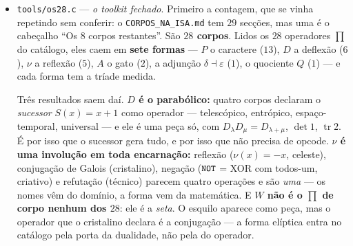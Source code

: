 \documentclass[11pt]{article}
\newcommand{\code}[1]{\texttt{\small #1}}
\newcommand{\Z}{\mathbb Z}
\theoremstyle{plain}
\theoremstyle{remark}
\newcommand{\tr}{\operatorname{tr}}
\begin{document}
\begin{itemize}
O rotor não é um terceiro objeto: é o \textbf{único autodual} --- o motor dissipa ($\tr<0$), o seu
dual amplifica ($\tr>0$), somados dão zero, que é conservar. E o telescópico e o celeste --- que é uma relação \emph{distinta} da dualidade, e a versão anterior tinha-as
juntado --- são o \emph{mesmo} objeto em duas bases: em $(1,j)$ com $j^2=1$ gira hiperbolicamente e tem norma
$N = a^2-b^2$; na base dos idempotentes cinde em duas cópias, e $N = \alpha\beta$ --- donde o
divisor de zero ser exatamente o cone nulo. \emph{Chamar-lhe defeito é dizer que a luz é um defeito
do espaço-tempo.}

E o que sobra fora do par tem uma marca só, em $\Z$: a volta existe no anel exatamente onde
$|\det| = 1$. \textbf{É por isso que a ISA só tem peças de $\det \pm 1$} --- não por escolha de
projeto, mas porque fora dali não há volta. O erro tem forma conhecida e vale mais que o
resultado: \emph{descrever uma peça pelo que lhe falta em vez de pelo que ela é}. ``Não tem
oposto'' é verdade sobre o polo e falso sobre o dipolo.
\item \code{tools/os28.c} --- \emph{o toolkit fechado}. Primeiro a contagem, que se vinha
repetindo sem conferir: o \code{CORPOS\_NA\_ISA.md} tem $29$ secções, mas uma é o cabeçalho ``Os
$8$ corpos restantes''. São \textbf{$28$ corpos}. Lidos os $28$ operadores $\prod$ do catálogo,
eles caem em \textbf{sete formas} --- $P$ o caractere ($13$), $D$ a deflexão ($6$), $\nu$ a
reflexão ($5$), $A$ o gato ($2$), a adjunção $\delta\dashv\varepsilon$ ($1$), o quociente $Q$
($1$) --- e cada forma tem a tríade medida.

Três resultados saem daí. \textbf{$D$ é o parabólico:} quatro corpos declaram o \emph{sucessor}
$S(x) = x+1$ como operador --- telescópico, entrópico, espaço-temporal, universal --- e ele é uma
peça só, com $D_\lambda D_\mu = D_{\lambda+\mu}$, $\det 1$, $\tr 2$. É por isso que o sucessor gera
tudo, e por isso que não precisa de opcode. \textbf{$\nu$ é uma involução em toda encarnação:}
reflexão ($\nu(x)=-x$, celeste), conjugação de Galois (cristalino), negação ($\code{NOT}$ = XOR
com todos-um, criativo) e refutação (técnico) parecem quatro operações e são \emph{uma} --- os
nomes vêm do domínio, a forma vem da matemática. E \textbf{$W$ não é o $\prod$ de corpo nenhum
dos $28$}: ele é a \emph{seta}. O esquilo aparece como peça, mas o operador que o cristalino
declara é a conjugação --- a forma elíptica entra no catálogo pela porta da dualidade, não pela do
operador.


\end{itemize}
\end{document}
